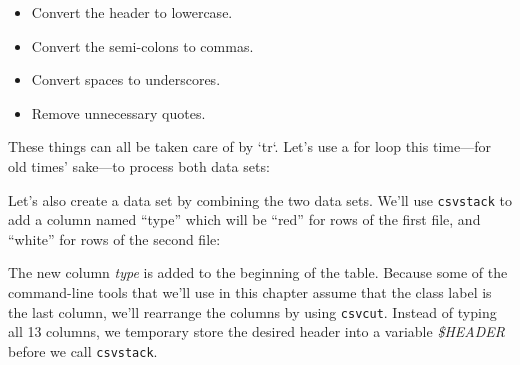 \documentclass[
]{book}
\newenvironment{Shaded}{\begin{snugshade}}{\end{snugshade}}
\newcommand{\DataTypeTok}[1]{\textcolor[rgb]{0.13,0.29,0.53}{#1}}
\newcommand{\ExtensionTok}[1]{#1}
\newcommand{\FunctionTok}[1]{\textcolor[rgb]{0.00,0.00,0.00}{#1}}
\newcommand{\KeywordTok}[1]{\textcolor[rgb]{0.13,0.29,0.53}{\textbf{#1}}}
\newcommand{\NormalTok}[1]{#1}
\newcommand{\OperatorTok}[1]{\textcolor[rgb]{0.81,0.36,0.00}{\textbf{#1}}}
\newcommand{\StringTok}[1]{\textcolor[rgb]{0.31,0.60,0.02}{#1}}
\newcommand{\VariableTok}[1]{\textcolor[rgb]{0.00,0.00,0.00}{#1}}
\providecommand{\tightlist}{%
  \setlength{\itemsep}{0pt}\setlength{\parskip}{0pt}}
\theoremstyle{definition}
\theoremstyle{definition}
\theoremstyle{definition}
\theoremstyle{remark}
\begin{document}
\begin{itemize}
\tightlist
\item
  Convert the header to lowercase.
\item
  Convert the semi-colons to commas.
\item
  Convert spaces to underscores.
\item
  Remove unnecessary quotes.
\end{itemize}

These things can all be taken care of by `tr`. Let's use a for loop this time---for old times' sake---to process both data sets:

\begin{Shaded}
\end{Shaded}

Let's also create a data set by combining the two data sets. We'll use \texttt{csvstack} to add a column named ``type'' which will be ``red'' for rows of the first file, and ``white'' for rows of the second file:

\begin{Shaded}
\end{Shaded}

The new column \emph{type} is added to the beginning of the table. Because some of the command-line tools that we'll use in this chapter assume that the class label is the last column, we'll rearrange the columns by using \texttt{csvcut}. Instead of typing all 13 columns, we temporary store the desired header into a variable \emph{\$HEADER} before we call \texttt{csvstack}.
\end{document}
